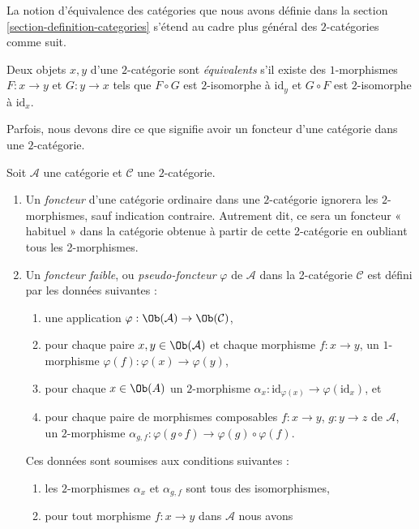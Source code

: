 \noindent
La notion d'équivalence des catégories que nous avons définie dans la section
\ref{section-definition-categories} s'étend au cadre plus général des
$2$-catégories comme suit.

\begin{definition}
\label{definition-equivalence}
Deux objets $x, y$ d'une $2$-catégorie sont {\it équivalents} s'il existe des
$1$-morphismes $F : x \to y$ et $G : y \to x$ tels que $F \circ G$ est
$2$-isomorphe à $\text{id}_y$ et $G \circ F$ est $2$-isomorphe à
$\text{id}_x$.
\end{definition}

\noindent
Parfois, nous devons dire ce que signifie avoir un foncteur d'une catégorie
dans une $2$-catégorie.

\begin{definition}
\label{definition-functor-into-2-category}
Soit $\mathcal{A}$ une catégorie et $\mathcal{C}$ une $2$-catégorie.
\begin{enumerate}
\item Un {\it foncteur} d'une catégorie ordinaire dans une $2$-catégorie
ignorera les $2$-morphismes, sauf indication contraire. Autrement dit, ce sera
un foncteur « habituel » dans la catégorie obtenue à partir de cette 2-catégorie en oubliant
tous les 2-morphismes.
\item Un {\it foncteur faible}, ou {\it pseudo-foncteur} $\varphi$ de
$\mathcal{A}$ dans la 2-catégorie $\mathcal{C}$ est défini par les données
suivantes :
\begin{enumerate}
\item une application $\varphi : \Ob(\mathcal{A}) \to \Ob(\mathcal{C})$,
\item pour chaque paire $x, y\in \Ob(\mathcal{A})$ et chaque morphisme $f : x \to y$, un $1$-morphisme $\varphi(f) : \varphi(x) \to \varphi(y)$,
\item pour chaque $x\in \Ob(A)$ un $2$-morphisme $\alpha_x : \text{id}_{\varphi(x)} \to \varphi(\text{id}_x)$, et
\item pour chaque paire de morphismes composables $f : x \to y$, $g : y \to z$
de $\mathcal{A}$, un $2$-morphisme $\alpha_{g, f} : \varphi(g \circ f) \to \varphi(g) \circ \varphi(f)$.
\end{enumerate}
Ces données sont soumises aux conditions suivantes :
\begin{enumerate}
\item les $2$-morphismes $\alpha_x$ et $\alpha_{g, f}$ sont tous des
isomorphismes,
\item pour tout morphisme $f : x \to y$ dans $\mathcal{A}$ nous avons

\end{enumerate}
\end{enumerate}
\end{definition}
